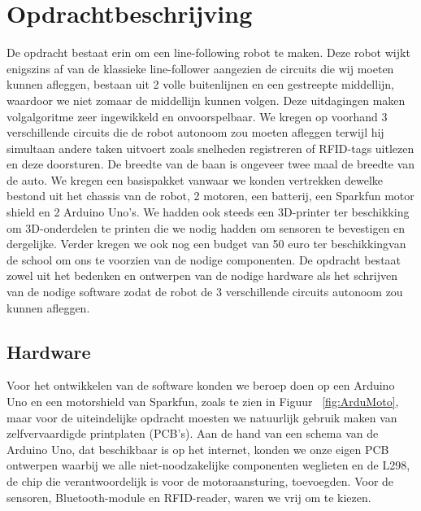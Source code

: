 \chapter{Opdrachtbeschrijving}
\label{chap:Opdrachtbeschrijving}
De opdracht bestaat erin om een line-following robot te maken. Deze robot wijkt enigszins af van de klassieke line-follower aangezien de circuits die wij moeten kunnen afleggen, bestaan uit 2 volle buitenlijnen en een gestreepte middellijn, waardoor we niet zomaar de middellijn kunnen volgen. Deze uitdagingen maken volgalgoritme zeer ingewikkeld en onvoorspelbaar. We kregen op voorhand 3 verschillende circuits die de robot autonoom zou moeten afleggen terwijl hij simultaan andere taken uitvoert zoals snelheden registreren of RFID-tags uitlezen en deze doorsturen. De breedte van de baan is ongeveer twee maal de breedte van de auto. We kregen een basispakket vanwaar we konden vertrekken dewelke bestond uit het chassis van de robot, 2 motoren, een batterij, een Sparkfun motor shield en 2 Arduino Uno's. We hadden ook steeds een 3D-printer ter beschikking om 3D-onderdelen te printen die we nodig hadden om sensoren te bevestigen en dergelijke. Verder kregen we ook nog een budget van 50 euro ter beschikkingvan de school om ons te voorzien van de nodige componenten. De opdracht bestaat zowel uit het bedenken en ontwerpen van de nodige hardware als het schrijven van de nodige software zodat de robot de 3 verschillende circuits autonoom zou kunnen afleggen.
\section{Hardware}
Voor het ontwikkelen van de software konden we beroep doen op een Arduino Uno en een motorshield van Sparkfun, zoals te zien in Figuur ~\ref{fig:ArduMoto}, maar voor de uiteindelijke opdracht moesten we natuurlijk gebruik maken van zelfvervaardigde printplaten (PCB's). Aan de hand van een schema van de Arduino Uno, dat beschikbaar is op het internet, konden we onze eigen PCB ontwerpen waarbij we alle niet-noodzakelijke componenten weglieten en de L298, de chip die verantwoordelijk is voor de motoraansturing, toevoegden. Voor de sensoren, Bluetooth-module en RFID-reader, waren we vrij om te kiezen.




